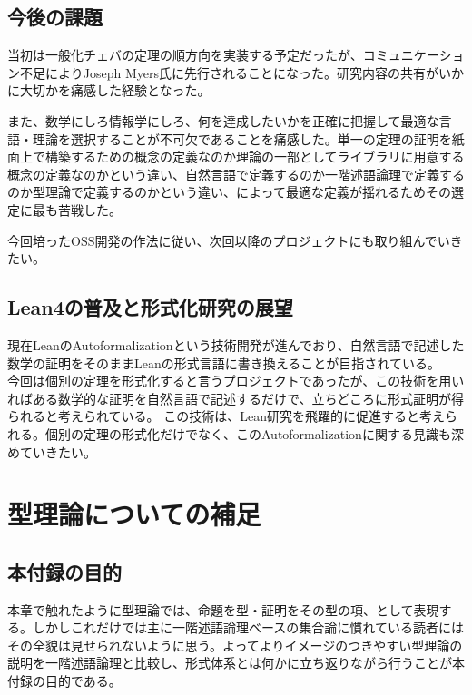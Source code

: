\documentclass[a4paper,12pt]{bxjsbook}
\newlength{\customindent}
\newenvironment{body}{
  \par
  \begingroup
  \setlength{\leftskip}{\customindent}
  \setlength{\rightskip}{0pt}
  \setlength{\parindent}{1em}
  \setlength{\displayindent}{\customindent}
  \setlength{\displaywidth}{\dimexpr\linewidth-\customindent\relax}
}{
  \par
  \endgroup
}
\theoremstyle{theorem}
\begin{document}
    \section{今後の課題}
    \begin{body}
        \indent 当初は一般化チェバの定理の順方向を実装する予定だったが、コミュニケーション不足によりJoseph Myers氏に先行されることになった。研究内容の共有がいかに大切かを痛感した経験となった。

        \indent また、数学にしろ情報学にしろ、何を達成したいかを正確に把握して最適な言語・理論を選択することが不可欠であることを痛感した。単一の定理の証明を紙面上で構築するための概念の定義なのか理論の一部としてライブラリに用意する概念の定義なのかという違い、自然言語で定義するのか一階述語論理で定義するのか型理論で定義するのかという違い、によって最適な定義が揺れるためその選定に最も苦戦した。
        
        \indent 今回培ったOSS開発の作法に従い、次回以降のプロジェクトにも取り組んでいきたい。
    \end{body}

    \section{Lean4の普及と形式化研究の展望}
    \begin{body}
        \indent 現在LeanのAutoformalizationという技術開発が進んでおり、自然言語で記述した数学の証明をそのままLeanの形式言語に書き換えることが目指されている。\\
        今回は個別の定理を形式化すると言うプロジェクトであったが、この技術を用いればある数学的な証明を自然言語で記述するだけで、立ちどころに形式証明が得られると考えられている。
        この技術は、Lean研究を飛躍的に促進すると考えられる。個別の定理の形式化だけでなく、このAutoformalizationに関する見識も深めていきたい。
    \end{body}

    \appendix

    \chapter{型理論についての補足}\label{appendix:type-theory}

    \section{本付録の目的}
    \begin{body}
        \indent 本章で触れたように型理論では、命題を型・証明をその型の項、として表現する。しかしこれだけでは主に一階述語論理ベースの集合論に慣れている読者にはその全貌は見せられないように思う。よってよりイメージのつきやすい型理論の説明を一階述語論理と比較し、形式体系とは何かに立ち返りながら行うことが本付録の目的である。
    \end{body}
\end{document}
